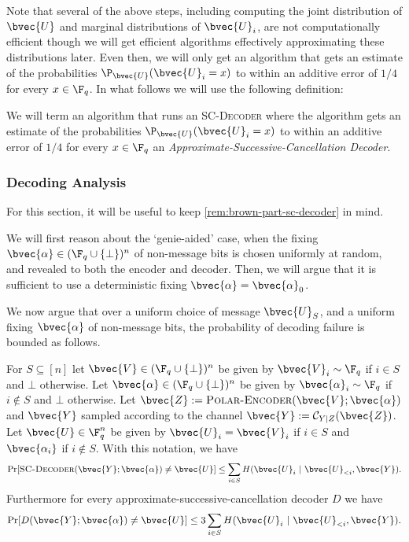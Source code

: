 \documentclass[11pt]{article}
\newcommand{\cC}{\mathcal{C}}
\begin{document}
Note that several of the above steps, including computing the joint distribution
of $\bvec{U}$ and marginal distributions of $\bvec{U}_i$,
are not computationally efficient
though we will get efficient algorithms effectively approximating these distributions later. Even then, we will only get an algorithm that gets an estimate of the probabilities $\P_{\bvec{U}}(\bvec{U}_i = x)$ to within an additive error of $1/4$ for every $x \in \F_q$. In what follows we will use the following definition:
	\begin{definition}
	\label{def:approx-sc-decoder}
	We will term an algorithm that runs an \textsc{SC-Decoder} where the algorithm gets an estimate of the probabilities $\P_{\bvec{U}}(\bvec{U}_i = x)$ to within an additive error of $1/4$ for every $x \in \F_q$  an {\em Approximate-Successive-Cancellation Decoder}.
	\end{definition}

\subsubsection{Decoding Analysis}

For this section, it will be useful to keep \cref{rem:brown-part-sc-decoder} in mind.

We will first reason about the `genie-aided' case, when the fixing $\bvec{\alpha} \in (\F_q\cup\{\bot\})^n$ of non-message bits is chosen uniformly at random, and revealed to both the encoder and decoder.
Then, we will argue that it is sufficient to use a deterministic fixing $\bvec{\alpha} = \bvec{\alpha}_0$.

We now argue that
over a uniform choice of message $\bvec{U}_S$,
and a uniform fixing $\bvec{\alpha}$ of non-message bits,
the probability of decoding failure is bounded as follows.

\begin{claim}
	\label{clm:small-failure-probability}
	For $S \subseteq [n]$ let $\bvec{V} \in (\F_q \cup\{\bot\})^n$ be given by $\bvec{V}_i \sim \F_q$ if $i \in S$ and $\bot$ otherwise.
	Let $\bvec{\alpha} \in (\F_q \cup\{\bot\})^n$ be given by $\bvec{\alpha}_i \sim \F_q$ if $i \not\in S$ and $\bot$ otherwise.
	Let $\bvec{Z} :=
	\textsc{Polar-Encoder}(\bvec{V};\bvec{\alpha})$ and $\bvec{Y}$ sampled according to the channel $\bvec{Y} := \cC_{Y|Z}(\bvec{Z})$. 
	Let $\bvec{U} \in \F_q^n$ be given by $\bvec{U}_i = \bvec{V}_i$ if $i \in S$ and $\bvec{\alpha_i}$ if $i \not\in S$. 
	With this notation, we have
	\begin{equation*}
		\Pr[
		\text{\sc SC-Decoder}(\bvec{Y}; \bvec{\alpha}) \neq \bvec{U} ]
		\leq  \sum_{i \in S} H( \bvec{U}_{i} ~|~ \bvec{U}_{< i}, \bvec{Y}).
	\end{equation*}
		Furthermore for every approximate-successive-cancellation decoder $D$ we have
		\begin{equation*}
			\Pr[
			D(\bvec{Y}; \bvec{\alpha}) \neq \bvec{U} ]
			\leq  3 \sum_{i \in S} H( \bvec{U}_{i} ~|~ \bvec{U}_{< i}, \bvec{Y}).
		\end{equation*}
\end{claim}
\end{document}
